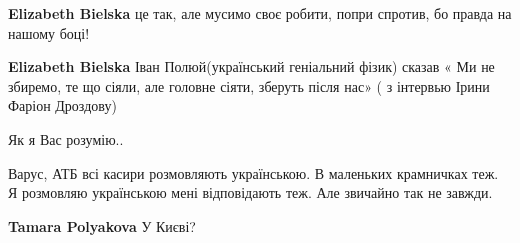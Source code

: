 \begin{itemize}
\begin{itemize}
 
\textbf{Elizabeth Bielska} це так, але мусимо своє робити, попри спротив, бо правда на нашому боці!

 
\textbf{Elizabeth Bielska} Іван Полюй(український геніальний фізик) сказав « Ми
не збиремо, те що сіяли, але головне сіяти, зберуть після нас» ( з інтервью
Ірини Фаріон Дроздову)
\end{itemize}

 
Як я Вас розумію..

 

Варус, АТБ всі касири розмовляють українською. В маленьких крамничках теж. Я
розмовляю українською мені відповідають теж. Але звичайно так не завжди.

\begin{itemize}
 
\textbf{Tamara Polyakova} У Києві?

 

\end{itemize}
\end{itemize}
